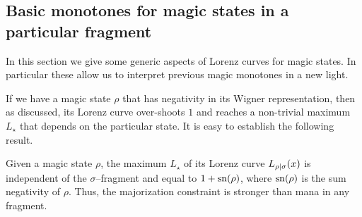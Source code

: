 \documentclass[pra,
aps,
twocolumn,
superscriptaddress,
groupedaddress,
nofootinbib,
reprint
]{revtex4-1}
\begin{document}
\subsection{Basic monotones for magic states in a particular fragment}
\label{sec:lc}

In this section we give some generic aspects of Lorenz curves for magic states. In particular these allow us to interpret previous magic monotones in a new light.

If we have a magic state $\rho$ that has negativity in its Wigner representation, then as discussed, its Lorenz curve over-shoots $1$ and reaches a non-trivial maximum $L_\star$ that depends on the particular state. It is easy to establish the following result.
\begin{lemma}\label{lem:lcmax}
	Given a magic state $\rho$, the maximum $L_\star$ of its Lorenz curve ${L_{\rho|\sigma}}(x)$ is independent of the $\sigma$--fragment and equal to $1+{{\rm{sn}}(\rho)}$, where $\rm{sn}(\rho)$ is the sum negativity of $\rho$. Thus, the majorization constraint is stronger than mana in any fragment.
\end{lemma}
\end{document}
